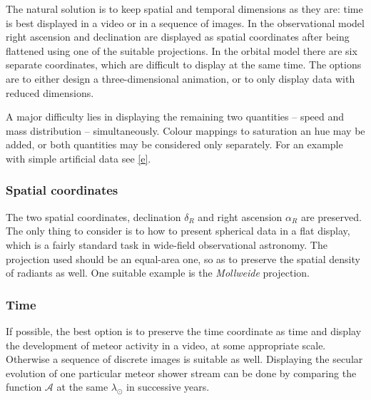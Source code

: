         The natural solution is to keep spatial and temporal dimensions as they are:
        time is best displayed in a video or in a sequence of images.
        In the observational model right ascension and declination are displayed as spatial coordinates after being
        flattened using one of the suitable projections.
        In the orbital model there are six separate coordinates, which are difficult to display at the same time.
        The options are to either design a three-dimensional animation, or to only display data with reduced dimensions.

        A major difficulty lies in displaying the remaining two quantities -- speed and mass distribution -- simultaneously.
        Colour mappings to saturation an hue may be added, or both quantities may be considered only separately.
        For an example with simple artificial data see \cref{e}.

        \subsubsection{Spatial coordinates} \label{iovs}
            The two spatial coordinates, declination $\delta_R$ and right ascension $\alpha_R$ are preserved.
            The only thing to consider is to how to present spherical data in a flat display,
            which is a fairly standard task in wide-field observational astronomy.
            The projection used should be an equal-area one, so as to preserve the spatial density of radiants as well.
            One suitable example is the \emph{Mollweide} projection.


        \subsubsection{Time} \label{iovt}
            If possible, the best option is to preserve the time coordinate as time
            and display the development of meteor activity in a video, at some appropriate scale.
            Otherwise a sequence of discrete images is suitable as well.
            Displaying the secular evolution of one particular meteor shower stream can be done
            by comparing the function $\mathcal{A}$ at the same $\lambda_\odot$ in successive years.

